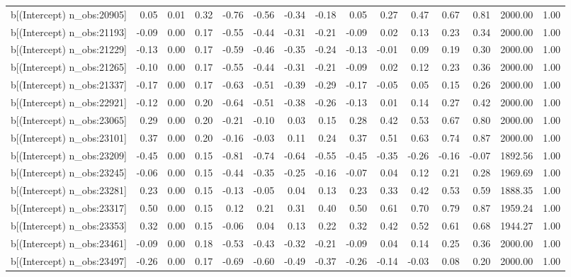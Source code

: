 \begin{table}[ht]
\begin{tabular}{rrrrrrrrrrrrrrr}
  b[(Intercept) n\_obs:20905] & 0.05 & 0.01 & 0.32 & -0.76 & -0.56 & -0.34 & -0.18 & 0.05 & 0.27 & 0.47 & 0.67 & 0.81 & 2000.00 & 1.00 \\ 
  b[(Intercept) n\_obs:21193] & -0.09 & 0.00 & 0.17 & -0.55 & -0.44 & -0.31 & -0.21 & -0.09 & 0.02 & 0.13 & 0.23 & 0.34 & 2000.00 & 1.00 \\ 
  b[(Intercept) n\_obs:21229] & -0.13 & 0.00 & 0.17 & -0.59 & -0.46 & -0.35 & -0.24 & -0.13 & -0.01 & 0.09 & 0.19 & 0.30 & 2000.00 & 1.00 \\ 
  b[(Intercept) n\_obs:21265] & -0.10 & 0.00 & 0.17 & -0.55 & -0.44 & -0.31 & -0.21 & -0.09 & 0.02 & 0.12 & 0.23 & 0.36 & 2000.00 & 1.00 \\ 
  b[(Intercept) n\_obs:21337] & -0.17 & 0.00 & 0.17 & -0.63 & -0.51 & -0.39 & -0.29 & -0.17 & -0.05 & 0.05 & 0.15 & 0.26 & 2000.00 & 1.00 \\ 
  b[(Intercept) n\_obs:22921] & -0.12 & 0.00 & 0.20 & -0.64 & -0.51 & -0.38 & -0.26 & -0.13 & 0.01 & 0.14 & 0.27 & 0.42 & 2000.00 & 1.00 \\ 
  b[(Intercept) n\_obs:23065] & 0.29 & 0.00 & 0.20 & -0.21 & -0.10 & 0.03 & 0.15 & 0.28 & 0.42 & 0.53 & 0.67 & 0.80 & 2000.00 & 1.00 \\ 
  b[(Intercept) n\_obs:23101] & 0.37 & 0.00 & 0.20 & -0.16 & -0.03 & 0.11 & 0.24 & 0.37 & 0.51 & 0.63 & 0.74 & 0.87 & 2000.00 & 1.00 \\ 
  b[(Intercept) n\_obs:23209] & -0.45 & 0.00 & 0.15 & -0.81 & -0.74 & -0.64 & -0.55 & -0.45 & -0.35 & -0.26 & -0.16 & -0.07 & 1892.56 & 1.00 \\ 
  b[(Intercept) n\_obs:23245] & -0.06 & 0.00 & 0.15 & -0.44 & -0.35 & -0.25 & -0.16 & -0.07 & 0.04 & 0.12 & 0.21 & 0.28 & 1969.69 & 1.00 \\ 
  b[(Intercept) n\_obs:23281] & 0.23 & 0.00 & 0.15 & -0.13 & -0.05 & 0.04 & 0.13 & 0.23 & 0.33 & 0.42 & 0.53 & 0.59 & 1888.35 & 1.00 \\ 
  b[(Intercept) n\_obs:23317] & 0.50 & 0.00 & 0.15 & 0.12 & 0.21 & 0.31 & 0.40 & 0.50 & 0.61 & 0.70 & 0.79 & 0.87 & 1959.24 & 1.00 \\ 
  b[(Intercept) n\_obs:23353] & 0.32 & 0.00 & 0.15 & -0.06 & 0.04 & 0.13 & 0.22 & 0.32 & 0.42 & 0.52 & 0.61 & 0.68 & 1944.27 & 1.00 \\ 
  b[(Intercept) n\_obs:23461] & -0.09 & 0.00 & 0.18 & -0.53 & -0.43 & -0.32 & -0.21 & -0.09 & 0.04 & 0.14 & 0.25 & 0.36 & 2000.00 & 1.00 \\ 
  b[(Intercept) n\_obs:23497] & -0.26 & 0.00 & 0.17 & -0.69 & -0.60 & -0.49 & -0.37 & -0.26 & -0.14 & -0.03 & 0.08 & 0.20 & 2000.00 & 1.00 \\ 

\end{tabular}
\end{table}
